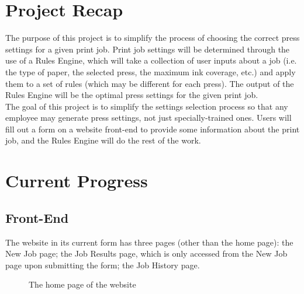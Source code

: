 \documentclass[onecolumn, draftclsnofoot,10pt, compsoc]{IEEEtran}
\begin{document}
\singlespacing

\section{Project Recap}
The purpose of this project is to simplify the process of choosing the correct press settings for a given print job. Print job settings will be determined through the use of a Rules Engine, which will take a collection of user inputs about a job (i.e. the type of paper, the selected press, the maximum ink coverage, etc.) and apply them to a set of rules (which may be different for each press). The output of the Rules Engine will be the optimal press settings for the given print job.\\[10pt]
The goal of this project is to simplify the settings selection process so that any employee may generate press settings, not just specially-trained ones. Users will fill out a form on a website front-end to provide some information about the print job, and the Rules Engine will do the rest of the work.

\vspace*{\floatsep}
\section{Current Progress}
\subsection{Front-End}
The website in its current form has three pages (other than the home page): the New Job page; the Job Results page, which is only accessed from the New Job page upon submitting the form; the Job History page.

\begin{figure}[!ht]
    \caption{The home page of the website}
    \label{fig:1}
\end{figure}
\end{document}
